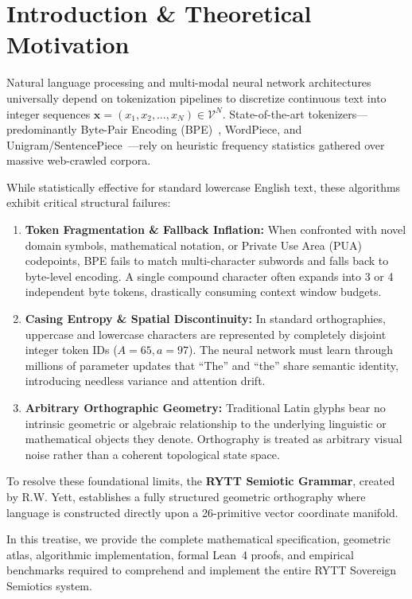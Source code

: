 \documentclass[11pt,oneside,letterpaper]{article}
\theoremstyle{definition}
\begin{document}
\section{Introduction \& Theoretical Motivation}

Natural language processing and multi-modal neural network architectures universally depend on tokenization pipelines to discretize continuous text into integer sequences $\mathbf{x} = (x_1, x_2, \dots, x_N) \in \mathcal{V}^N$. State-of-the-art tokenizers---predominantly Byte-Pair Encoding (BPE)~\cite{sennrich2016bpe}, WordPiece, and Unigram/SentencePiece~\cite{kudo2018subword}---rely on heuristic frequency statistics gathered over massive web-crawled corpora. 

While statistically effective for standard lowercase English text, these algorithms exhibit critical structural failures:
\begin{enumerate}
  \item \textbf{Token Fragmentation \& Fallback Inflation:} When confronted with novel domain symbols, mathematical notation, or Private Use Area (PUA) codepoints, BPE fails to match multi-character subwords and falls back to byte-level encoding. A single compound character often expands into 3 or 4 independent byte tokens, drastically consuming context window budgets.
  \item \textbf{Casing Entropy \& Spatial Discontinuity:} In standard orthographies, uppercase and lowercase characters are represented by completely disjoint integer token IDs ($A = 65, a = 97$). The neural network must learn through millions of parameter updates that ``The'' and ``the'' share semantic identity, introducing needless variance and attention drift.
  \item \textbf{Arbitrary Orthographic Geometry:} Traditional Latin glyphs bear no intrinsic geometric or algebraic relationship to the underlying linguistic or mathematical objects they denote. Orthography is treated as arbitrary visual noise rather than a coherent topological state space.
\end{enumerate}

To resolve these foundational limits, the \textbf{RYTT Semiotic Grammar}, created by R.W. Yett, establishes a fully structured geometric orthography where language is constructed directly upon a 26-primitive vector coordinate manifold. 

In this treatise, we provide the complete mathematical specification, geometric atlas, algorithmic implementation, formal Lean~4 proofs, and empirical benchmarks required to comprehend and implement the entire RYTT Sovereign Semiotics system.
\end{document}

